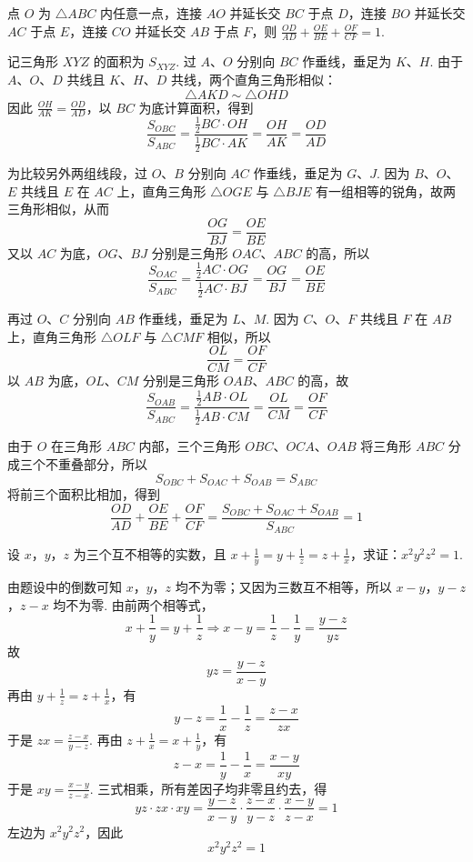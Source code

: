 \begin{problem}
点 \(O\) 为 \(\triangle ABC\) 内任意一点，连接 \(AO\) 并延长交 \(BC\) 于点 \(D\)，连接 \(BO\) 并延长交 \(AC\) 于点 \(E\)，连接 \(CO\) 并延长交 \(AB\) 于点 \(F\)，则 \(\frac{OD}{AD}+\frac{OE}{BE}+\frac{OF}{CF}=1\).

\end{problem}

\begin{solution}
记三角形 \(XYZ\) 的面积为 \(S_{XYZ}\). 过 \(A\)、\(O\) 分别向 \(BC\) 作垂线，垂足为 \(K\)、\(H\). 由于 \(A\)、\(O\)、\(D\) 共线且 \(K\)、\(H\)、\(D\) 共线，两个直角三角形相似：
\[
\triangle AKD\sim\triangle OHD
\]
因此 \(\frac{OH}{AK}=\frac{OD}{AD}\)，以 \(BC\) 为底计算面积，得到
\[
\frac{S_{OBC}}{S_{ABC}}
=\frac{\frac12BC\cdot OH}{\frac12BC\cdot AK}
=\frac{OH}{AK}
=\frac{OD}{AD}
\]

为比较另外两组线段，过 \(O\)、\(B\) 分别向 \(AC\) 作垂线，垂足为 \(G\)、\(J\). 因为 \(B\)、\(O\)、\(E\) 共线且 \(E\) 在 \(AC\) 上，直角三角形 \(\triangle OGE\) 与 \(\triangle BJE\) 有一组相等的锐角，故两三角形相似，从而
\[
\frac{OG}{BJ}=\frac{OE}{BE}
\]
又以 \(AC\) 为底，\(OG\)、\(BJ\) 分别是三角形 \(OAC\)、\(ABC\) 的高，所以
\[
\frac{S_{OAC}}{S_{ABC}}
=\frac{\frac12AC\cdot OG}{\frac12AC\cdot BJ}
=\frac{OG}{BJ}
=\frac{OE}{BE}
\]

再过 \(O\)、\(C\) 分别向 \(AB\) 作垂线，垂足为 \(L\)、\(M\). 因为 \(C\)、\(O\)、\(F\) 共线且 \(F\) 在 \(AB\) 上，直角三角形 \(\triangle OLF\) 与 \(\triangle CMF\) 相似，所以
\[
\frac{OL}{CM}=\frac{OF}{CF}
\]
以 \(AB\) 为底，\(OL\)、\(CM\) 分别是三角形 \(OAB\)、\(ABC\) 的高，故
\[
\frac{S_{OAB}}{S_{ABC}}
=\frac{\frac12AB\cdot OL}{\frac12AB\cdot CM}
=\frac{OL}{CM}
=\frac{OF}{CF}
\]

由于 \(O\) 在三角形 \(ABC\) 内部，三个三角形 \(OBC\)、\(OCA\)、\(OAB\) 将三角形 \(ABC\) 分成三个不重叠部分，所以
\[
S_{OBC}+S_{OAC}+S_{OAB}=S_{ABC}
\]
将前三个面积比相加，得到
\[
\frac{OD}{AD}+\frac{OE}{BE}+\frac{OF}{CF}
=\frac{S_{OBC}+S_{OAC}+S_{OAB}}{S_{ABC}}=1
\]
\end{solution}

\begin{problem}
设 \(x\)，\(y\)，\(z\) 为三个互不相等的实数，且 \(x+\frac{1}{y}=y+\frac{1}{z}=z+\frac{1}{x}\)，求证：\(x^2y^2z^2=1\).
\end{problem}

\begin{solution}
由题设中的倒数可知 \(x\)，\(y\)，\(z\) 均不为零；又因为三数互不相等，所以 \(x-y\)，\(y-z\)，\(z-x\) 均不为零. 由前两个相等式，
\[
x+\frac{1}{y}=y+\frac{1}{z}
\Longrightarrow x-y=\frac{1}{z}-\frac{1}{y}=\frac{y-z}{yz}
\]
故
\[
yz=\frac{y-z}{x-y}
\]
再由 \(y+\frac{1}{z}=z+\frac{1}{x}\)，有
\[
y-z=\frac{1}{x}-\frac{1}{z}=\frac{z-x}{zx}
\]
于是 \(zx=\frac{z-x}{y-z}\).
再由 \(z+\frac{1}{x}=x+\frac{1}{y}\)，有
\[
z-x=\frac{1}{y}-\frac{1}{x}=\frac{x-y}{xy}
\]
于是 \(xy=\frac{x-y}{z-x}\).
三式相乘，所有差因子均非零且约去，得
\[
yz\cdot zx\cdot xy
=\frac{y-z}{x-y}\cdot\frac{z-x}{y-z}\cdot\frac{x-y}{z-x}=1
\]
左边为 \(x^2y^2z^2\)，因此
\[
x^2y^2z^2=1
\]
\end{solution}

